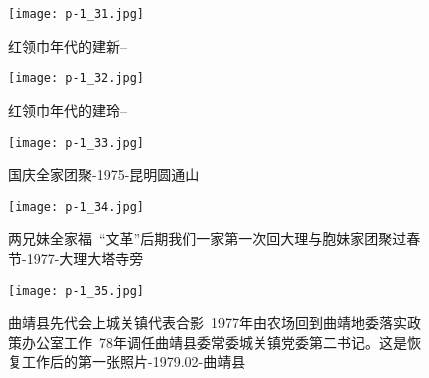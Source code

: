 \clearpage


\begin{figure}
    \begin{center}
        \texttt{[image: p-1\_31.jpg]}
        \begin{shaded}
            \caption{红领巾年代的建新--}
        \end{shaded}
    \end{center}
\end{figure}

\clearpage


\begin{figure}
    \begin{center}
        \texttt{[image: p-1\_32.jpg]}
        \begin{shaded}
            \caption{红领巾年代的建玲--}
        \end{shaded}
    \end{center}
\end{figure}

\clearpage


\begin{figure}
    \begin{center}
        \texttt{[image: p-1\_33.jpg]}
        \begin{shaded}
            \caption{国庆全家团聚-1975-昆明圆通山}
        \end{shaded}
    \end{center}
\end{figure}

\clearpage


\begin{figure}
    \begin{center}
        \texttt{[image: p-1\_34.jpg]}
        \begin{shaded}
            \caption{两兄妹全家福~“文革”后期我们一家第一次回大理与胞妹家团聚过春节-1977-大理大塔寺旁}
        \end{shaded}
    \end{center}
\end{figure}

\clearpage


\begin{figure}
    \begin{center}
        \texttt{[image: p-1\_35.jpg]}
        \begin{shaded}
            \caption{曲靖县先代会上城关镇代表合影~1977年由农场回到曲靖地委落实政策办公室工作~78年调任曲靖县委常委城关镇党委第二书记。这是恢复工作后的第一张照片-1979.02-曲靖县}
        \end{shaded}
    \end{center}
\end{figure}

